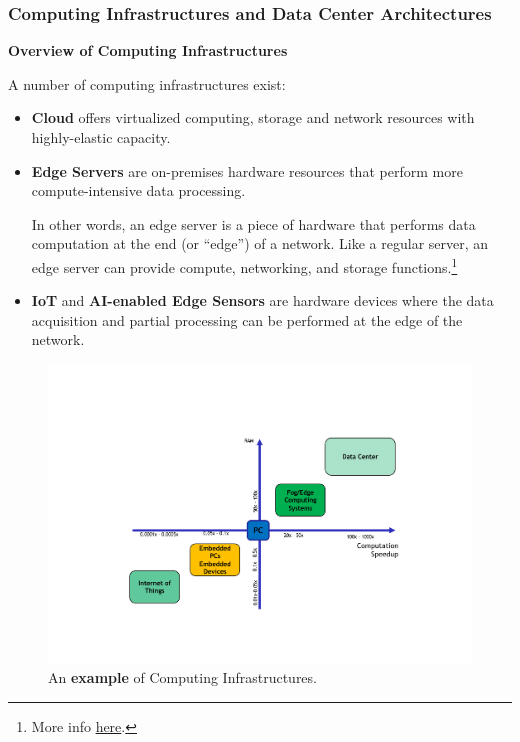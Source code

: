 \documentclass[a4paper]{article}
\newcommand{\dquotes}[1]{``#1''}
\newcommand{\example}[1]{\textcolor{Green4}{\textbf{#1}}}
\begin{document}
    \subsubsection{Computing Infrastructures and Data Center Architectures}

    \begin{center}
        \textcolor{Red2}{\textbf{Overview of Computing Infrastructures}}
    \end{center}

    \noindent
    A number of computing infrastructures exist:
    \begin{itemize}
        \item \textbf{Cloud} offers virtualized computing, storage and network resources with highly-elastic capacity.
        
        
        \item \textbf{Edge Servers} are on-premises hardware resources that perform more compute-intensive data processing.
        
        In other words, an edge server is a piece of hardware that performs data computation at the end (or \dquotes{edge}) of a network. Like a regular server, an edge server can provide compute, networking, and storage functions.\footnote{More info \href{https://phoenixnap.com/blog/edge-server}{here}.}

        
        \item \textbf{IoT} and \textbf{AI-enabled Edge Sensors} are hardware devices where the data acquisition and partial processing can be performed at the edge of the network.
    \end{itemize}

    \begin{figure}[!htp]
        \centering
        \includegraphics[width=\textwidth]{img/example-computing-infrastructure-1.pdf}
        \caption{An \example{example} of Computing Infrastructures.\cite{computing-infrastructures-slides}}
    \end{figure}
\end{document}
